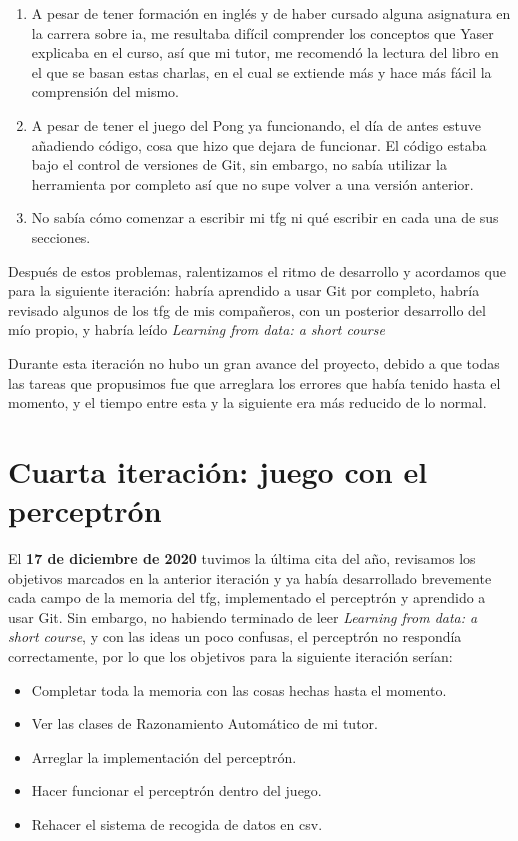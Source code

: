 \begin{enumerate}
	\item A pesar de tener formación en inglés y de haber cursado alguna asignatura en la carrera sobre \gls{ia}, me resultaba difícil comprender los conceptos que Yaser explicaba en el curso, así que mi tutor, me recomendó la lectura del libro en el que se basan estas charlas, en el cual se extiende más y hace más fácil la comprensión del mismo.
	\item A pesar de tener el juego del Pong ya funcionando, el día de antes estuve añadiendo código, cosa que hizo que dejara de funcionar. El código estaba bajo el control de versiones de Git, sin embargo, no sabía utilizar la herramienta por completo así que no supe volver a una versión anterior.
	\item No sabía cómo comenzar a escribir mi \gls{tfg} ni qué escribir en cada una de sus secciones.
\end{enumerate}

Después de estos problemas, ralentizamos el ritmo de desarrollo y acordamos que para la siguiente iteración: habría aprendido a usar Git por completo, habría revisado algunos de los \gls{tfg} de mis compañeros, con un posterior desarrollo del mío propio, y habría leído \textit{Learning from data: a short course} \cite{LearningFromData}

Durante esta iteración no hubo un gran avance del proyecto, debido a que todas las tareas que propusimos fue que arreglara los errores que había tenido hasta el momento, y el tiempo entre esta y la siguiente era más reducido de lo normal.

\section{Cuarta iteración: juego con el perceptrón}
El \textbf{17 de diciembre de 2020} tuvimos la última cita del año, revisamos los objetivos marcados en la anterior iteración y ya había desarrollado brevemente cada campo de la memoria del \gls{tfg}, implementado el perceptrón y aprendido a usar Git. Sin embargo, no habiendo terminado de leer \textit{Learning from data: a short course}, y con las ideas un poco confusas, el perceptrón no respondía correctamente, por lo que los objetivos para la siguiente iteración serían:
\begin{itemize}
  \item Completar toda la memoria con las cosas hechas hasta el momento.
  \item Ver las clases de Razonamiento Automático de mi tutor.
  \item Arreglar la implementación del perceptrón.
  \item Hacer funcionar el perceptrón dentro del juego.
  \item Rehacer el sistema de recogida de datos en \gls{csv}.
\end{itemize}

